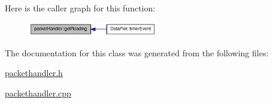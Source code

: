 Here is the caller graph for this function:\nopagebreak
\begin{figure}[H]
\begin{center}
\leavevmode
\includegraphics[width=160pt]{classpacketHandler_aec6fa94602daa18227491b76001152cb_icgraph}
\end{center}
\end{figure}




The documentation for this class was generated from the following files:\begin{DoxyCompactItemize}
\item 
\hyperlink{packethandler_8h}{packethandler.h}\item 
\hyperlink{packethandler_8cpp}{packethandler.cpp}\end{DoxyCompactItemize}
